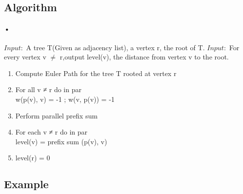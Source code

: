 \documentclass[twoside]{article}
\begin{document}
\subsection{Algorithm}
\paragraph{•}
$Input: $ A tree T(Given as adjacency list), a vertex r, the root of T.
$Input: $ For every vertex v $\neq$ r,output level(v), the distance from vertex v to the root.

\begin{enumerate}
\item Compute Euler Path for the tree T rooted at vertex r
\item For all v ≠ r do in par \\
      w(p(v), v) = -1 ; w(v, p(v)) = -1
\item Perform parallel prefix sum 
\item For each v ≠ r do in par \\
      level(v) = prefix sum (p(v), v)
\item level(r) = 0
\end{enumerate}

\subsection{Example}
\end{document}
